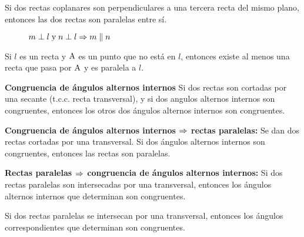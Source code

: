 \begin{theorem}
    Si dos rectas coplanares son perpendiculares a una tercera recta del mismo plano, entonces las dos rectas son paralelas entre sí.

    \begin{figure}[!h]
        \centering
        
        \caption{$m \perp l \;\text{y}\; n \perp l \Rightarrow m \parallel n$}
        \label{fig:theorem20}
    \end{figure}
    
\end{theorem}

\begin{theorem}
    Si $l$ es un recta y $\rm A$ es un punto que no está en $l$, entonces existe al menos una recta que pasa por $\rm A$ y es paralela a $l$.
\end{theorem}

\clearpage

\begin{theorem}{\textbf{Congruencia de ángulos alternos internos}}
    Si dos rectas son cortadas por una secante (t.c.c. recta transversal), y si dos angulos alternos internos son congruentes, entonces los otros dos ángulos alternos internos son congruentes.
\end{theorem}

\begin{theorem}{\textbf{Congruencia de ángulos alternos internos $\Rightarrow$ rectas paralelas:}}
    Se dan dos rectas cortadas por una transversal. Si dos ángulos alternos internos son congruentes, entonces las rectas son paralelas.
\end{theorem}

\begin{theorem}{\textbf{Rectas paralelas $\Rightarrow$ congruencia de ángulos alternos internos:}}
    Si dos rectas paralelas son intersecadas por una transversal, entonces los ángulos alternos internos que determinan son congruentes.
\end{theorem}

\begin{figure}[!h]
    \centering
    
    \label{fig:theorem7}
\end{figure}

\begin{theorem}
    Si dos rectas paralelas se intersecan por una transversal, entonces los ángulos correspondientes que determinan son congruentes.
\end{theorem}

